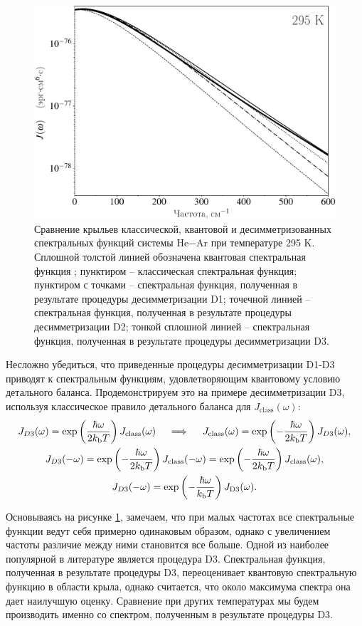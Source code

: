 \begin{figure}
    \centering
    \includegraphics[width=0.7\linewidth]{./pictures/two_atom_spectra/spectral_function_desymmetrizations-crop.pdf}
    \caption{Сравнение крыльев классической, квантовой и десимметризованных спектральных функций системы He$-$Ar при температуре 295 K. Сплошной толстой линией обозначена квантовая спектральная функция \cite{buryak2014}; пунктиром -- классическая спектральная функция; пунктиром с точками -- спектральная функция, полученная в результате процедуры десимметризации D1; точечной линией -- спектральная функция, полученная в результате процедуры десимметризации D2; тонкой сплошной линией -- спектральная функция, полученная в результате процедуры десимметризации D3.}
    \label{fig:desymmetrisation-spectral-functions}
\end{figure}

Несложно убедиться, что приведенные процедуры десимметризации D1-D3 приводят к спектральным функциям, удовлетворяющим квантовому условию детального баланса. Продемонстрируем это на примере десимметризации D3, используя классическое правило детального баланса для $J_\text{class}(\omega)$:
\begin{gather}
    J_{D3}(\omega) = \exp \left( \frac{\hbar \omega}{2 k_\text{b} T} \right) J_\text{class}(\omega) \quad \implies \quad J_\text{class}(\omega) = \exp \left( -\frac{\hbar \omega}{2 k_\text{b} T} \right) J_{D3}(\omega), \label{d1} \\
    J_{D3}(-\omega) = \exp \left( -\frac{\hbar \omega}{2 k_\text{b} T} \right) J_\text{class}(-\omega) = \exp \left( -\frac{\hbar \omega}{2 k_\text{b} T} \right) J_\text{class}(\omega), \label{d2} \\
    J_{D3}(-\omega) = \exp \left( -\frac{\hbar \omega}{k_\text{b} T} \right) J_\text{D3}(\omega). \label{d3}
\end{gather}

Основываясь на рисунке \ref{fig:desymmetrisation-spectral-functions}, замечаем, что при малых частотах все спектральные функции ведут себя примерно одинаковым образом, однако с увеличением частоты различие между ними становится все больше. Одной из наиболее популярной в литературе является процедура D3. Спектральная функция, полученная в результате процедуры D3, переоценивает квантовую спектральную функцию в области крыла, однако считается, что около максимума спектра она дает наилучшую оценку. Сравнение при других температурах мы будем производить именно со спектром, полученным в результате процедуры D3. \par

